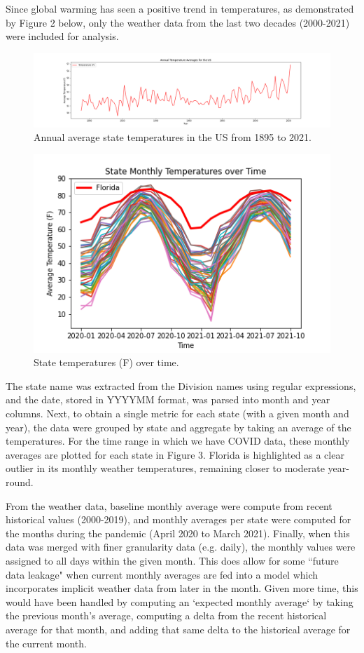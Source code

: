 \documentclass[11pt]{article}
\begin{document}
Since global warming has seen a positive trend in temperatures,  as demonstrated by Figure 2 below, only the weather data from the last two decades (2000-2021) were included for analysis.
 
\begin{figure}[h]
\centering
\includegraphics[scale=0.35]{"../figures/global_warming.png"}
\caption{Annual average state temperatures in the US from 1895 to 2021. }
\end{figure}


\begin{figure}
\centering
\includegraphics[scale=0.55]{"../figures/state_month_temps_FL.png"}
\caption{State temperatures (F) over time.}
\end{figure}
The state name was extracted from the Division names using regular expressions, and the date, stored in YYYYMM format, was parsed into month and year columns. Next, to obtain a single metric for each state (with a given month and year), the data were grouped by state and aggregate by taking an average of the temperatures. For the time range in which we have COVID data, these monthly averages are plotted for each state in Figure 3.  Florida is highlighted as a clear outlier in its monthly weather temperatures, remaining closer to moderate year-round. 

From the weather data, baseline monthly average were compute from recent historical values (2000-2019), and monthly averages per state were computed for the months during the pandemic (April 2020 to March 2021). Finally, when this data was merged with finer granularity data (e.g. daily), the monthly values were assigned to all days within the given month. This does allow for some ``future data leakage" when current monthly averages are fed into a model which incorporates implicit weather data from later in the month. Given more time, this would have been handled by computing an `expected monthly average` by taking the previous month's average, computing a delta from the recent historical average for that month, and adding that same delta to the historical average for the current month. 
\end{document}
